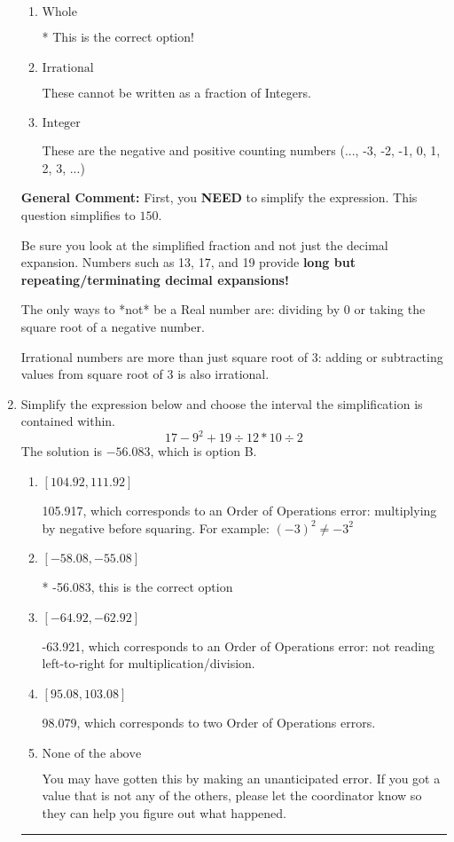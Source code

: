 \documentclass{extbook}[14pt]
\newcommand{\litem}[1]{\item #1

\rule{\textwidth}{0.4pt}}
\begin{document}
\begin{enumerate}
{\begin{enumerate}[label=\Alph*.]
These are numbers that can be written as fraction of Integers (e.g., -2/3)
\item \( \text{Whole} \)

* This is the correct option!
\item \( \text{Irrational} \)

These cannot be written as a fraction of Integers.
\item \( \text{Integer} \)

These are the negative and positive counting numbers (..., -3, -2, -1, 0, 1, 2, 3, ...)
\end{enumerate}

\textbf{General Comment:} First, you \textbf{NEED} to simplify the expression. This question simplifies to $150$. 
 
 Be sure you look at the simplified fraction and not just the decimal expansion. Numbers such as 13, 17, and 19 provide \textbf{long but repeating/terminating decimal expansions!} 
 
 The only ways to *not* be a Real number are: dividing by 0 or taking the square root of a negative number. 
 
 Irrational numbers are more than just square root of 3: adding or subtracting values from square root of 3 is also irrational.
}
\litem{
Simplify the expression below and choose the interval the simplification is contained within.
\[ 17 - 9^2 + 19 \div 12 * 10 \div 2 \]
The solution is \( -56.083 \), which is option B.\begin{enumerate}[label=\Alph*.]
\item \( [104.92, 111.92] \)

 105.917, which corresponds to an Order of Operations error: multiplying by negative before squaring. For example: $(-3)^2 \neq -3^2$
\item \( [-58.08, -55.08] \)

* -56.083, this is the correct option
\item \( [-64.92, -62.92] \)

 -63.921, which corresponds to an Order of Operations error: not reading left-to-right for multiplication/division.
\item \( [95.08, 103.08] \)

 98.079, which corresponds to two Order of Operations errors.
\item \( \text{None of the above} \)

 You may have gotten this by making an unanticipated error. If you got a value that is not any of the others, please let the coordinator know so they can help you figure out what happened.
\end{enumerate}

}
\end{enumerate}
\end{document}
